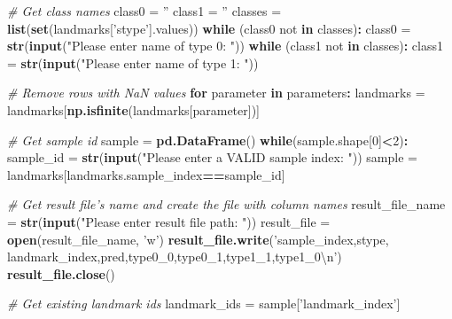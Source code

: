 \documentclass[10pt,letterpaper]{article}
\newenvironment{Shaded}{\begin{snugshade}}{\end{snugshade}}
\newcommand{\KeywordTok}[1]{\textcolor[rgb]{0.13,0.29,0.53}{\textbf{#1}}}
\newcommand{\DecValTok}[1]{\textcolor[rgb]{0.00,0.00,0.81}{#1}}
\newcommand{\CharTok}[1]{\textcolor[rgb]{0.31,0.60,0.02}{#1}}
\newcommand{\StringTok}[1]{\textcolor[rgb]{0.31,0.60,0.02}{#1}}
\newcommand{\CommentTok}[1]{\textcolor[rgb]{0.56,0.35,0.01}{\textit{#1}}}
\newcommand{\ControlFlowTok}[1]{\textcolor[rgb]{0.13,0.29,0.53}{\textbf{#1}}}
\newcommand{\OperatorTok}[1]{\textcolor[rgb]{0.81,0.36,0.00}{\textbf{#1}}}
\newcommand{\NormalTok}[1]{#1}
\begin{document}
\begin{Shaded}
\begin{Highlighting}[]
    \CommentTok{# Get class names}
\NormalTok{    class0 =}\StringTok{ ''}
\NormalTok{    class1 =}\StringTok{ ''}
\NormalTok{    classes =}\StringTok{ }\KeywordTok{list}\NormalTok{(}\KeywordTok{set}\NormalTok{(landmarks[}\StringTok{'stype'}\NormalTok{].values))}
    \ControlFlowTok{while}\NormalTok{ (class0 not }\ControlFlowTok{in}\NormalTok{ classes)}\OperatorTok{:}
\StringTok{        }\NormalTok{class0 =}\StringTok{ }\KeywordTok{str}\NormalTok{(}\KeywordTok{input}\NormalTok{(}\StringTok{"Please enter name of type 0: "}\NormalTok{))}
    \ControlFlowTok{while}\NormalTok{ (class1 not }\ControlFlowTok{in}\NormalTok{ classes)}\OperatorTok{:}
\StringTok{        }\NormalTok{class1 =}\StringTok{ }\KeywordTok{str}\NormalTok{(}\KeywordTok{input}\NormalTok{(}\StringTok{"Please enter name of type 1: "}\NormalTok{))}

    \CommentTok{# Remove rows with NaN values}
    \ControlFlowTok{for}\NormalTok{ parameter }\ControlFlowTok{in}\NormalTok{ parameters}\OperatorTok{:}
\StringTok{        }\NormalTok{landmarks =}\StringTok{ }\NormalTok{landmarks[}\KeywordTok{np.isfinite}\NormalTok{(landmarks[parameter])]}

    \CommentTok{# Get sample id}
\NormalTok{    sample =}\StringTok{ }\KeywordTok{pd.DataFrame}\NormalTok{()}
    \ControlFlowTok{while}\NormalTok{(sample.shape[}\DecValTok{0}\NormalTok{]}\OperatorTok{<}\DecValTok{2}\NormalTok{)}\OperatorTok{:}
\StringTok{        }\NormalTok{sample_id =}\StringTok{ }\KeywordTok{str}\NormalTok{(}\KeywordTok{input}\NormalTok{(}\StringTok{"Please enter a VALID sample index: "}\NormalTok{))}
\NormalTok{        sample =}\StringTok{ }\NormalTok{landmarks[landmarks.sample_index}\OperatorTok{==}\NormalTok{sample_id]}

    \CommentTok{# Get result file's name and create the file with column names}
\NormalTok{    result_file_name =}\StringTok{ }\KeywordTok{str}\NormalTok{(}\KeywordTok{input}\NormalTok{(}\StringTok{"Please enter result file path: "}\NormalTok{))}
\NormalTok{    result_file =}\StringTok{ }\KeywordTok{open}\NormalTok{(result_file_name, }\StringTok{'w'}\NormalTok{)}
    \KeywordTok{result_file.write}\NormalTok{(}\StringTok{'sample_index,stype,}
\StringTok{        landmark_index,pred,type0_0,type0_1,type1_1,type1_0}\CharTok{\textbackslash{}n}\StringTok{'}\NormalTok{)}
    \KeywordTok{result_file.close}\NormalTok{()}

    \CommentTok{# Get existing landmark ids}
\NormalTok{    landmark_ids =}\StringTok{ }\NormalTok{sample[}\StringTok{'landmark_index'}\NormalTok{]}


\end{Highlighting}
\end{Shaded}
\end{document}
